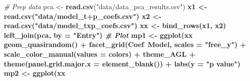 \documentclass[
]{article}
\newenvironment{Shaded}{\begin{snugshade}}{\end{snugshade}}
\newcommand{\CommentTok}[1]{\textcolor[rgb]{0.56,0.35,0.01}{\textit{#1}}}
\newcommand{\DataTypeTok}[1]{\textcolor[rgb]{0.13,0.29,0.53}{#1}}
\newcommand{\KeywordTok}[1]{\textcolor[rgb]{0.13,0.29,0.53}{\textbf{#1}}}
\newcommand{\NormalTok}[1]{#1}
\newcommand{\OperatorTok}[1]{\textcolor[rgb]{0.81,0.36,0.00}{\textbf{#1}}}
\newcommand{\StringTok}[1]{\textcolor[rgb]{0.31,0.60,0.02}{#1}}
\begin{document}
\begin{Shaded}
\begin{Highlighting}[]
\CommentTok{# Prep data}
\NormalTok{pca <-}\StringTok{ }\KeywordTok{read.csv}\NormalTok{(}\StringTok{"data/data_pca_results.csv"}\NormalTok{) }\OperatorTok{%
\NormalTok{x1 <-}\StringTok{ }\KeywordTok{read.csv}\NormalTok{(}\StringTok{"data/model_t+p_coefs.csv"}\NormalTok{) }\OperatorTok{%
\NormalTok{x2 <-}\StringTok{ }\KeywordTok{read.csv}\NormalTok{(}\StringTok{"data/model_txp_coefs.csv"}\NormalTok{) }\OperatorTok{%
\NormalTok{xx <-}\StringTok{ }\KeywordTok{bind_rows}\NormalTok{(x1, x2) }\OperatorTok{%
\StringTok{  }\KeywordTok{left_join}\NormalTok{(pca, }\DataTypeTok{by =} \StringTok{"Entry"}\NormalTok{) }\OperatorTok{%
\CommentTok{# Plot}
\NormalTok{mp1 <-}\StringTok{ }\KeywordTok{ggplot}\NormalTok{(xx}\OperatorTok{%
\StringTok{  }\KeywordTok{geom_quasirandom}\NormalTok{() }\OperatorTok{+}\StringTok{ }
\StringTok{  }\KeywordTok{facet_grid}\NormalTok{(Coef}\OperatorTok{~}\NormalTok{Model, }\DataTypeTok{scales =} \StringTok{"free_y"}\NormalTok{) }\OperatorTok{+}\StringTok{ }
\StringTok{  }\KeywordTok{scale_color_manual}\NormalTok{(}\DataTypeTok{values =}\NormalTok{ colors) }\OperatorTok{+}
\StringTok{  }\NormalTok{theme_AGL }\OperatorTok{+}
\StringTok{  }\KeywordTok{theme}\NormalTok{(}\DataTypeTok{panel.grid.major.x =} \KeywordTok{element_blank}\NormalTok{())  }\OperatorTok{+}
\StringTok{  }\KeywordTok{labs}\NormalTok{(}\DataTypeTok{y =} \StringTok{"p value"}\NormalTok{)}
\NormalTok{mp2 <-}\StringTok{ }\KeywordTok{ggplot}\NormalTok{(xx}\OperatorTok{%
}}}}}}}
\end{Highlighting}
\end{Shaded}
\end{document}
